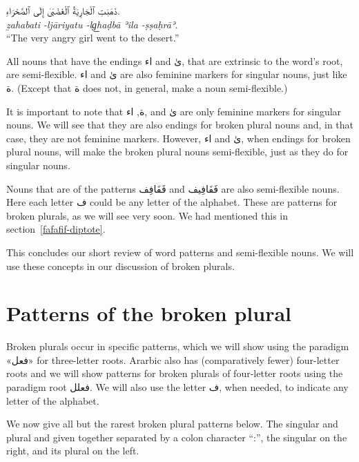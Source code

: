 \documentclass[
  10pt,
]{book}
\begin{document}
\foreignlanguage{arabic}{ذَهَبَتِ ٱلْجَارِيَةُ ٱلْغَضْبَىٰ إِلَى ٱلصَّحْرَاءِ.}\\
\emph{ẕahabati -ljāriyatu -lg͟haḍbā ʾila -ṣṣaḥrāʾ.}\\
\enquote{The very angry girl went to the desert.}

All nouns that have the endings \foreignlanguage{arabic}{اء} and \foreignlanguage{arabic}{ىٰ}, that are extrinsic to the word's root, are semi-flexible.
\foreignlanguage{arabic}{اء} and \foreignlanguage{arabic}{ىٰ} are also feminine markers for singular nouns, just like \foreignlanguage{arabic}{ة}. (Except that \foreignlanguage{arabic}{ة} does not, in general, make a noun semi-flexible.)

It is important to note that \foreignlanguage{arabic}{ة}, \foreignlanguage{arabic}{اء}, and \foreignlanguage{arabic}{ىٰ} are only feminine markers for singular nouns. We will see that they are also endings for broken plural nouns and, in that case, they are not feminine markers. However,
\foreignlanguage{arabic}{اء} and \foreignlanguage{arabic}{ىٰ}, when endings for broken plural nouns, will make the broken plural nouns semi-flexible, just as they do for singular nouns.

Nouns that are of the patterns \foreignlanguage{arabic}{فَفَافِف} and \foreignlanguage{arabic}{فَفَافِيف} are also semi-flexible nouns. Here each letter \foreignlanguage{arabic}{ف} could be any letter of the alphabet.
These are patterns for broken plurals, as we will see very soon.
We had mentioned this in section~\ref{fafafif-diptote}.

This concludes our short review of word patterns and semi-flexible nouns. We will use these concepts in our discussion of broken plurals.

\section{Patterns of the broken plural}\label{patterns-of-the-broken-plural}

Broken plurals occur in specific patterns, which we will show using the paradigm \foreignlanguage{arabic}{«فعل»} for three-letter roots. Ararbic also has (comparatively fewer) four-letter roots and we will show patterns for broken plurals of four-letter roots using the paradigm root \foreignlanguage{arabic}{فعلل}. We will also use the letter \foreignlanguage{arabic}{ف}, when needed, to indicate any letter of the alphabet.

We now give all but the rarest broken plural patterns below. The singular and plural and given together separated by a colon character \enquote{:}, the singular on the right, and its plural on the left.
\end{document}
